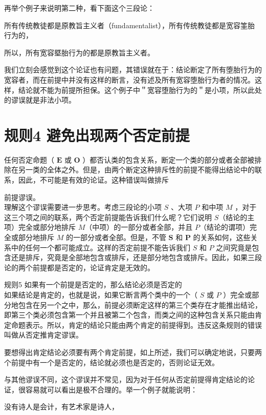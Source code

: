 再举个例子来说明第二种，看下面这个三段论：

所有传统教徒都是原教旨主义者（fundamentalist），所有传统教徒都是宽容筀胎行为的，

所以，所有宽容塈胎行为的都是原教旨主义者。

我们立刻会感觉到这个论证也有问题，其错误就在于：结论断定了所有堕胎行为的宽容者，而在前提中并没有这样的断言，没有述及所有宽容堕胎行为者的情况。这样，结论就不能为前提所担保。这个例子中＂宽容堕胎行为的＂是小项，所以此处的谬误就是非法小项。

\section*{规则4 避免出现两个否定前提}
任何否定命题（ $\mathbf{E}$ 或 $\mathbf{O}$ ）都否认类的包含关系，断定一个类的部分或者全部被排除在另一类的全体之外。但是，由两个断定这种排斥性的前提不能得出结论中的联系，因此，不可能是有效的论证。这种错误叫做排斥

前提谬误。\\
理解这个谬误需要进一步思考。考虑三段论的小项 $S$ 、大项 $P$ 和中项 $M$ ，对于这三个项之间的联系，两个否定前提能告诉我们什么呢？它们说明 $S$（结论的主项）完全或部分地排斥 $M$（中项）的一部分或者全部，并且 $P$（结论的谓项）完全或部分地排斥 $M$ 的一部分或者全部。但是，不管 $\boldsymbol{S}$ 和 $\boldsymbol{P}$ 的关系如何，这些关系中的任何一个都可能成立。这样的否定前提不能告诉我们 $S$ 和 $P$ 之间究竟是包含还是排斥，究竟是全部地包含或排斥，还是部分地包含或排斥。因此，如果三段论的两个前提都是否定的，论证肯定是无效的。

规则5 如果有一个前提是否定的，那么结论必须是否定的\\
如果结论是肯定的，也就是说，如果它断言两个类中的一个（ $S$ 或 $P$ ）完全或部分地包含在另一个之中，那么，前提必须断定这样的第三个类存在才能推出结论，即第三个类必须包含第一个并且被第二个包含，而类之间的这种包含关系只能由肯定命题表示。所以，肯定的结论只能由两个肯定的前提得到。违反这条规则的错误叫做从否定推肯定谬误。

要想得出肯定结论必须要有两个肯定前提，如上所述，我们可以确定地说，只要两个前提中有一个是否定的，结论就必须也是否定的，否则论证无效。

与其他谬误不同，这个谬误并不常见，因为对于任何从否定前提得肯定结论的论证，很容易就可以看出是极不合理的。举一个例子就能说明：

\begin{displayquote}
没有诗人是会计，有艺术家是诗人，
\end{displayquote}

